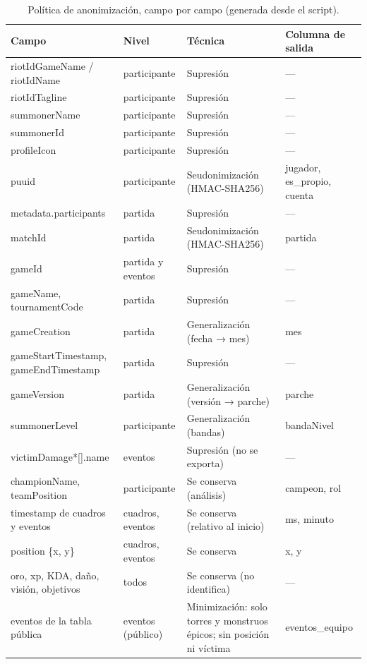 \begin{table}[H]
\centering
\small
\caption{Política de anonimización, campo por campo (generada desde el script).}
\label{tab:politica}
\begin{tabular}{p{4.2cm}p{2.3cm}p{4.6cm}p{2.4cm}}
\toprule
Campo & Nivel & Técnica & Columna de salida \\
\midrule
riotIdGameName / riotIdName & participante & Supresión & — \\
riotIdTagline & participante & Supresión & — \\
summonerName & participante & Supresión & — \\
summonerId & participante & Supresión & — \\
profileIcon & participante & Supresión & — \\
puuid & participante & Seudonimización (HMAC-SHA256) & jugador, es\_propio, cuenta \\
metadata.participants & partida & Supresión & — \\
matchId & partida & Seudonimización (HMAC-SHA256) & partida \\
gameId & partida y eventos & Supresión & — \\
gameName, tournamentCode & partida & Supresión & — \\
gameCreation & partida & Generalización (fecha → mes) & mes \\
gameStartTimestamp, gameEndTimestamp & partida & Supresión & — \\
gameVersion & partida & Generalización (versión → parche) & parche \\
summonerLevel & participante & Generalización (bandas) & bandaNivel \\
victimDamage*[].name & eventos & Supresión (no se exporta) & — \\
championName, teamPosition & participante & Se conserva (análisis) & campeon, rol \\
timestamp de cuadros y eventos & cuadros, eventos & Se conserva (relativo al inicio) & ms, minuto \\
position \{x, y\} & cuadros, eventos & Se conserva & x, y \\
oro, xp, KDA, daño, visión, objetivos & todos & Se conserva (no identifica) & — \\
eventos de la tabla pública & eventos (público) & Minimización: solo torres y monstruos épicos; sin posición ni víctima & eventos\_equipo \\
\bottomrule
\end{tabular}
\end{table}
